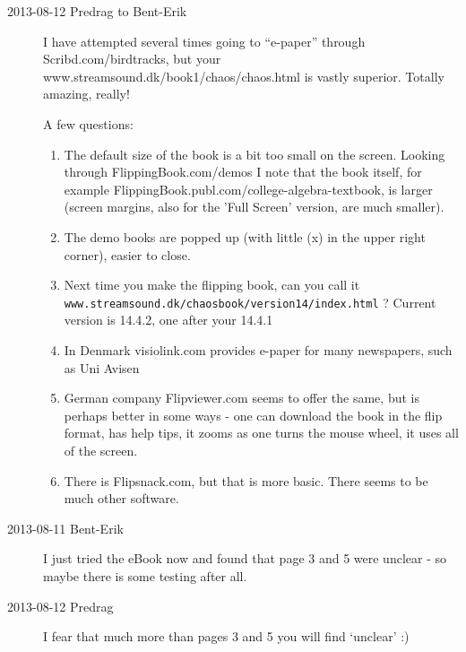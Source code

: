 \begin{description}

\item[2013-08-12 Predrag to Bent-Erik]
I have attempted several times going to ``e-paper'' through
 {Scribd.com/birdtracks},
but your
\\
{www.streamsound.dk/book1/chaos/chaos.html} is vastly superior.
Totally amazing, really!

A few questions:

\begin{enumerate}
    \item
The default size of the book is a bit too small on the screen.
Looking through 
{FlippingBook.com/demos} I note that the book itself, for example
{FlippingBook.publ.com/college-algebra-textbook}, is larger (screen
margins, also for the 'Full Screen' version, are much smaller).
  \item
The demo books are popped up (with little (x) in the upper right corner),
easier to close.
  \item
Next time you make the flipping book, can you call it
\\
\texttt{www.streamsound.dk/chaosbook/version14/index.html} ?
Current version is 14.4.2, one after your 14.4.1
  \item
In Denmark  {visiolink.com}
provides e-paper for many newspapers, such as
 {Uni Avisen}
  \item
German company  {Flipviewer.com} seems to offer
the same, but is perhaps better in some ways - one can download the book in the
flip format, has help tips, it zooms as one turns the
mouse wheel, it uses all of the screen.
  \item
There is  {Flipsnack.com},
but that is more basic. There seems to be much other software.

\end{enumerate}

\item[2013-08-11 Bent-Erik]
I just tried the eBook now and found that page 3 and 5 were unclear - so
maybe there is some testing after all.

\item[2013-08-12 Predrag] I fear that much more than
pages 3 and 5 you will find `unclear' :)


\end{description}
